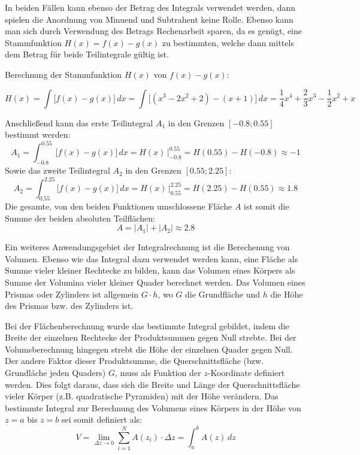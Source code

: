 In beiden F\"{a}llen kann ebenso der Betrag des Integrals verwendet werden, dann spielen die Anordnung von Minuend und Subtrahent keine Rolle. Ebenso kann man sich durch Verwendung des Betrags Rechenarbeit sparen, da es gen\"{u}gt, eine Stammfunktion $H(x) = f(x) - g(x)$ zu bestimmten, welche dann mittels dem Betrag f\"{u}r beide Teilintegrale g\"{u}ltig ist.

Berechnung der Stammfunktion $H(x)$ von $f(x) - g(x)$: 

$$H(x) = \int \big[ f(x) - g(x) \big] \, dx = \int \big[ (x^3 - 2x^2 + 2) - (x + 1)\big] \, dx = \frac{1}{4}x^4 + \frac{2}{3}x^3 - \frac{1}{2}x^2 + x$$

\pagebreak

Anschlie\ss{}end kann das erste Teilintegral $A_1$ in den Grenzen $[-0.8 ; 0.55]$ bestimmt werden: $$A_1 = \int_{-0.8}^{0.55} \big[ f(x) - g(x)\big] \, dx = H(x) \, \Big|_{-0.8}^{0.55} = H(0.55) - H(-0.8) \approx -1$$ Sowie das zweite Teilintegral $A_2$ in den Grenzen $[0.55 ; 2.25]$: $$A_2 = \int_{0.55}^{2.25} \big[ f(x) - g(x)\big] \, dx = H(x) \, \Big|_{0.55}^{2.25} = H(2.25) - H(0.55) \approx 1.8$$ Die gesamte, von den beiden Funktionen umschlossene Fl\"{a}che $A$ ist somit die Summe der beiden absoluten Teilfl\"{a}chen: $$A = | A_1 | + | A_2 | \approx 2.8$$


Ein weiteres Anwendungsgebiet der Integralrechnung ist die Berechenung von Volumen. Ebenso wie das Integral dazu verwendet werden kann, eine Fl\"{a}che als Summe vieler kleiner Rechtecke zu bilden, kann das Volumen eines K\"{o}rpers als Summe der Volumina vieler kleiner Quader berechnet werden. Das Volumen eines Prismas oder Zylinders ist allgemein $G \cdot h$, wo $G$ die Grundfl\"{a}che und $h$ die H\"{o}he des Prismas bzw. des Zylinders ist. 

Bei der Fl\"{a}chenberechnung wurde das bestimmte Integral gebildet, indem die Breite der einzelnen Rechtecke der Produktsummen gegen Null strebte. Bei der Volumsberechnung hingegen strebt die H\"{o}he der einzelnen Quader gegen Null. Der andere Faktor dieser Produktsumme, die Querschnittsfl\"{a}che (bzw. Grundl\"{a}che jeden Quaders) $G$, muss als Funktion der $z$-Koordinate definiert werden. Dies folgt daraus, dass sich die Breite und L\"{a}nge der Querschnittsfl\"{a}che vieler K\"{o}rper (z.B. quadratische Pyramiden) mit der H\"{o}he ver\"{a}ndern. Das bestimmte Integral zur Berechnung des Volumens eines K\"{o}rpers in der H\"{o}he von $z = a$ bis $z = b$ sei somit definiert als: $$V = \lim_{\Delta z \rightarrow 0} \sum_{i=1}^{N} A(z_i) \cdot \Delta z = \int_a^b A(z) \, dz$$

